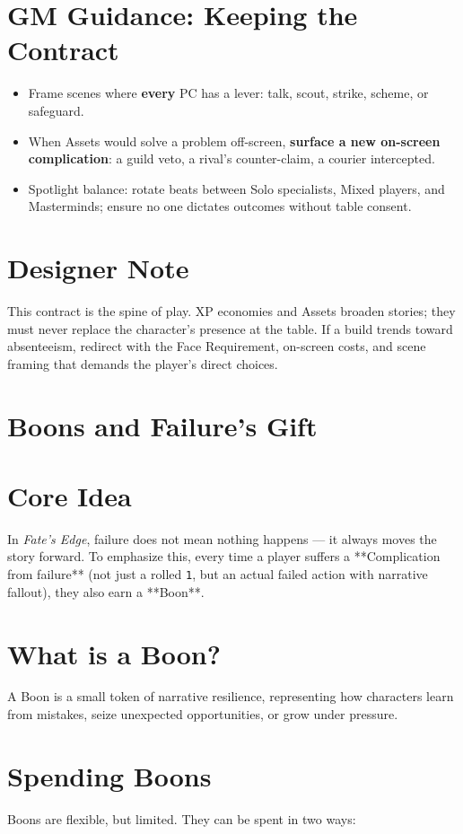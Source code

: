 \documentclass[12pt]{book}
\begin{document}
\section{GM Guidance: Keeping the Contract}
\begin{itemize}
  \item Frame scenes where \textbf{every} PC has a lever: talk, scout, strike, scheme, or safeguard.
  \item When Assets would solve a problem off-screen, \textbf{surface a new on-screen complication}: a guild veto, a rival’s counter-claim, a courier intercepted.
  \item Spotlight balance: rotate beats between Solo specialists, Mixed players, and Masterminds; ensure no one dictates outcomes without table consent.
\end{itemize}

\section{Designer Note}
This contract is the spine of play. XP economies and Assets broaden stories; they must never replace the character’s presence at the table. If a build trends toward absenteeism, redirect with the Face Requirement, on-screen costs, and scene framing that demands the player’s direct choices.

\section{Boons and Failure's Gift}

\section*{Core Idea}
In \textit{Fate’s Edge}, failure does not mean nothing happens — it always moves the story forward.  
To emphasize this, every time a player suffers a **Complication from failure** (not just a rolled \texttt{1}, but an actual failed action with narrative fallout), they also earn a **Boon**.

\section*{What is a Boon?}
A Boon is a small token of narrative resilience, representing how characters learn from mistakes, seize unexpected opportunities, or grow under pressure.

\section*{Spending Boons}
Boons are flexible, but limited. They can be spent in two ways:
\end{document}

